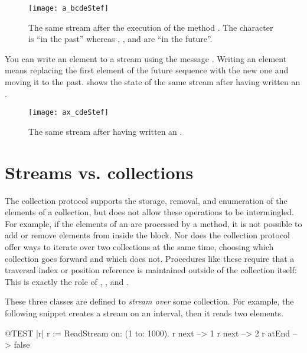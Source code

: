 \documentclass[a4paper,10pt,twoside]{book}
\begin{document}
\begin{figure}[ht]
\centerline{\texttt{[image: a\_bcdeStef]}}
\caption{The same stream after the execution of the method .
The character  is ``in the past'' whereas , ,  and  are ``in the future''.}
\label{fig:a_bcde}
\vspace{.2in}
\end{figure}

You can write an element to a stream using the message  . Writing an element means replacing the first element of the future sequence with the new one and moving it to the past.
 shows the state of the same stream after having written an .

\begin{figure}[h!t]
\centerline{\texttt{[image: ax\_cdeStef]}}
\caption{The same stream after having written an .}
\label{fig:ax_cde}
\vspace{.2in}
\end{figure}

\section{Streams vs. collections}

The collection protocol supports the storage, removal, and enumeration of the elements of a collection, but does not allow these operations
to be intermingled.
For example, if the elements of an  are processed by a  method, it is not
possible to add or remove elements from inside the  block.
Nor does the collection protocol offer ways to iterate over two collections at the same time, choosing which collection goes forward
and which does not.
Procedures like these require that a traversal index or position reference is maintained outside of the collection itself:
This is exactly the role of , , and .

These three classes are defined to \emph{stream over} some collection.
For example, the following snippet creates a stream on an interval, then it reads two elements.
\begin{code}{@TEST |r|}
r := ReadStream on: (1 to: 1000).
r next   --> 1
r next   --> 2
r atEnd --> false
\end{code}
\end{document}
